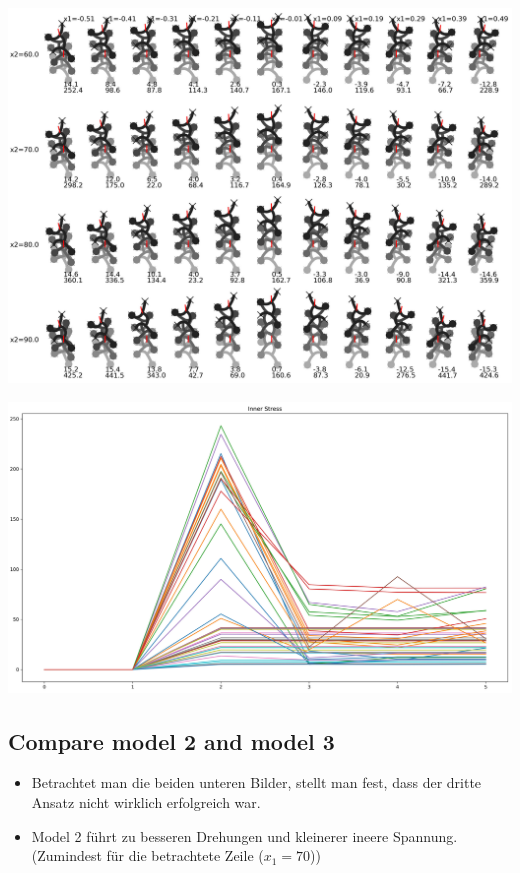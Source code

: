 \documentclass[10pt,a4paper]{article}
\begin{document}
\includegraphics[width=.95\textwidth]{pics/model_3/gait.jpg}

\includegraphics[width=.95\textwidth]{pics/model_3/GeckoBotGaitStress.jpg}





\subsection{Compare model 2 and model 3}

\begin{itemize}
	\item Betrachtet man die beiden unteren Bilder, stellt man fest, dass der dritte Ansatz nicht wirklich erfolgreich war.
	\item Model 2 führt zu besseren Drehungen und kleinerer ineere Spannung. (Zumindest für die betrachtete Zeile ($x_1 = 70$))
\end{itemize}
\end{document}
